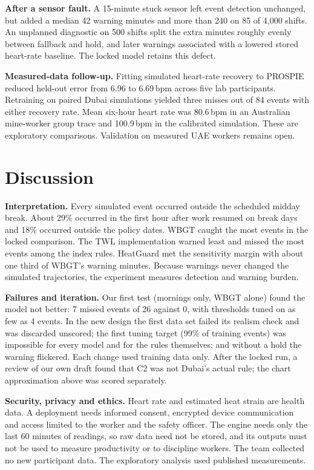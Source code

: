 \documentclass[conference,a4paper]{IEEEtran}
\begin{document}
\textbf{After a sensor fault.} A 15-minute stuck sensor left event detection unchanged, but added a median 42 warning minutes and more than 240 on 85 of 4,000 shifts. An unplanned diagnostic on 500 shifts split the extra minutes roughly evenly between fallback and hold, and later warnings associated with a lowered stored heart-rate baseline. The locked model retains this defect.

\textbf{Measured-data follow-up.} Fitting simulated heart-rate recovery to PROSPIE \cite{prospie} reduced held-out error from 6.96 to 6.69\,bpm across five lab participants. Retraining on paired Dubai simulations yielded three misses out of 84 events with either recovery rate. Mean six-hour heart rate was 80.6\,bpm in an Australian mine-worker group trace \cite{taggart} and 100.9\,bpm in the calibrated simulation. These are exploratory comparisons. Validation on measured UAE workers remains open.

\section{Discussion}
\textbf{Interpretation.} Every simulated event occurred outside the scheduled midday break. About 29\% occurred in the first hour after work resumed on break days and 18\% occurred outside the policy dates. WBGT caught the most events in the locked comparison. The TWL implementation warned least and missed the most events among the index rules. HeatGuard met the sensitivity margin with about one third of WBGT's warning minutes. Because warnings never changed the simulated trajectories, the experiment measures detection and warning burden.

\textbf{Failures and iteration.} Our first test (mornings only, WBGT alone) found the model not better: 7 missed events of 26 against 0, with thresholds tuned on as few as 4 events. In the new design the first data set failed its realism check and was discarded unscored; the first tuning target (99\% of training events) was impossible for every model and for the rules themselves; and without a hold the warning flickered. Each change used training data only. After the locked run, a review of our own draft found that C2 was not Dubai's actual rule; the chart approximation above was scored separately.

\textbf{Security, privacy and ethics.} Heart rate and estimated heat strain are health data. A deployment needs informed consent, encrypted device communication and access limited to the worker and the safety officer. The engine needs only the last 60 minutes of readings, so raw data need not be stored, and its outputs must not be used to measure productivity or to discipline workers. The team collected no new participant data. The exploratory analysis used published measurements.
\end{document}
